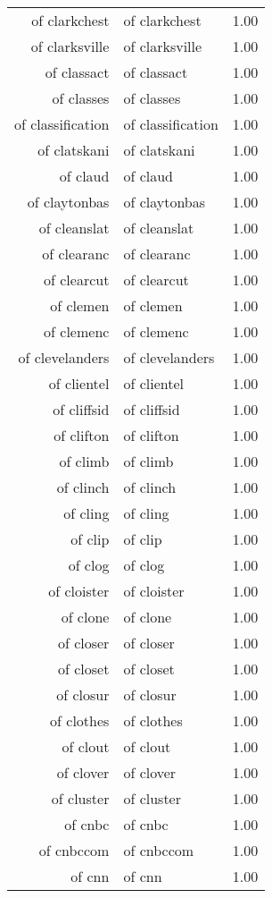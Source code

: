 \begin{table}[ht]
\begin{tabular}{rlr}
  of clarkchest & of clarkchest & 1.00 \\ 
  of clarksville & of clarksville & 1.00 \\ 
  of classact & of classact & 1.00 \\ 
  of classes & of classes & 1.00 \\ 
  of classification & of classification & 1.00 \\ 
  of clatskani & of clatskani & 1.00 \\ 
  of claud & of claud & 1.00 \\ 
  of claytonbas & of claytonbas & 1.00 \\ 
  of cleanslat & of cleanslat & 1.00 \\ 
  of clearanc & of clearanc & 1.00 \\ 
  of clearcut & of clearcut & 1.00 \\ 
  of clemen & of clemen & 1.00 \\ 
  of clemenc & of clemenc & 1.00 \\ 
  of clevelanders & of clevelanders & 1.00 \\ 
  of clientel & of clientel & 1.00 \\ 
  of cliffsid & of cliffsid & 1.00 \\ 
  of clifton & of clifton & 1.00 \\ 
  of climb & of climb & 1.00 \\ 
  of clinch & of clinch & 1.00 \\ 
  of cling & of cling & 1.00 \\ 
  of clip & of clip & 1.00 \\ 
  of clog & of clog & 1.00 \\ 
  of cloister & of cloister & 1.00 \\ 
  of clone & of clone & 1.00 \\ 
  of closer & of closer & 1.00 \\ 
  of closet & of closet & 1.00 \\ 
  of closur & of closur & 1.00 \\ 
  of clothes & of clothes & 1.00 \\ 
  of clout & of clout & 1.00 \\ 
  of clover & of clover & 1.00 \\ 
  of cluster & of cluster & 1.00 \\ 
  of cnbc & of cnbc & 1.00 \\ 
  of cnbccom & of cnbccom & 1.00 \\ 
  of cnn & of cnn & 1.00 \\ 

\end{tabular}
\end{table}
